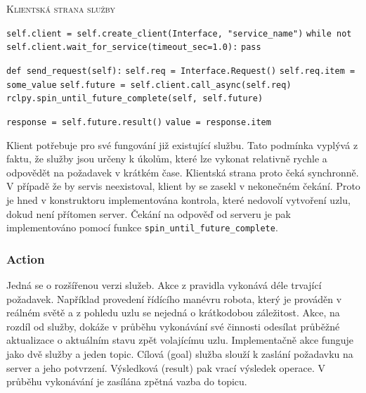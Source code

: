 \begin{algorithm}[h!]
	\label{}
	\caption{\textsc{Klientská strana služby}}
	
	\DontPrintSemicolon
	\SetAlgoNoLine
	\SetNlSty{}{}{:}
	\SetNlSkip{-1.1em}
	
	\BlankLine \Indp\Indpp
	
	\texttt{self.client = self.create\_client(Interface, "service\_name")}\;
	\texttt{while not self.client.wait\_for\_service(timeout\_sec=1.0):}\;
	\Indp\Indp
	\texttt{pass}\;
	\Indm\Indm

	\BlankLine
	\texttt{def send\_request(self):}\;
	\Indp\Indp
	\texttt{self.req = Interface.Request()}\;
	\texttt{self.req.item = some\_value}\;
	\texttt{self.future = self.client.call\_async(self.req)}\;
	\texttt{rclpy.spin\_until\_future\_complete(self, self.future)}\;
	
	\BlankLine
	\texttt{response = self.future.result()}\;
	\texttt{value = response.item}\;
\end{algorithm}
\newpage
Klient potřebuje pro své fungování již existující službu. Tato podmínka vyplývá z faktu, že služby jsou určeny k úkolům, které lze vykonat relativně rychle a odpovědět na požadavek v krátkém čase. Klientská strana proto čeká synchronně. V případě že by servis neexistoval, klient by se zasekl v nekonečném čekání. Proto je hned v konstruktoru implementována kontrola, které nedovolí vytvoření uzlu, dokud není přítomen server. Čekání na odpověď od serveru je pak implementováno pomocí funkce \verb|spin_until_future_complete|. \cite{ros2_documentation}

\subsubsection*{Action} \label{theory:action}
Jedná se o rozšířenou verzi služeb. Akce z pravidla vykonává déle trvající požadavek. Například provedení řídícího manévru robota, který je prováděn v reálném světě a z pohledu uzlu se nejedná o krátkodobou záležitost. Akce, na rozdíl od služby, dokáže v průběhu vykonávání své činnosti odesílat průběžné aktualizace o aktuálním stavu zpět volajícímu uzlu. \cite[str:~6]{ros2_introduction} Implementačně akce funguje jako dvě služby a jeden topic. Cílová (goal) služba slouží k zaslání požadavku na server a jeho potvrzení. Výsledková (result) pak vrací výsledek operace. V průběhu vykonávání je zasílána zpětná vazba do topicu. \cite{ros2_documentation}

